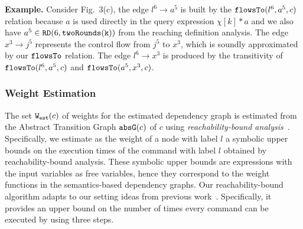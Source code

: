 \textbf{Example.}
Consider Fig.~3(c),  
the edge $l^6 \to a^5$ is built by the $\mathtt{flowsTo}(l^6, a^5, c)$ relation because
$a$ is used directly in the query expression $\chi[k]*a$
and we also have $a^5 \in \mathtt{RD}(6, \mathtt{twoRounds(k)})$ from the reaching definition analysis.
The edge $x^3 \to j^5$  represents the control flow from $j^5$ to $x^3$, which is soundly approximated by our $\mathtt{flowsTo}$ relation.
The edge $l^6 \to x^3$ is produced by the transitivity of $\mathtt{flowsTo}(l^6, a^5, c)$ and $\mathtt{flowsTo}(a^5, x^3, c)$. 

\subsubsection{Weight Estimation}
\label{sec:alg_weightgen}
The set $\mathtt{{W_{est}}}(c)$ of weights for the estimated dependency graph is estimated from the Abstract Transition Graph $\mathtt{abs}{\mathtt{G}}(c)$ of $c$ using \emph{reachability-bound analysis}~\cite{GulwaniZ10}. Specifically, we estimate as the weight of a node with label $l$ a symbolic upper bounds on the execution times of the command with label $l$ obtained by reachability-bound analysis. These symbolic upper bounds are expressions with the input variables as free variables, hence they correspond to the weight functions in the semantics-based dependency graphs. 
Our reachability-bound algorithm adapts to our setting ideas from previous work~\cite{ZulegerGSV11,SinnZV14,sinn2017complexity}.
Specifically, it provides an upper bound on the number of times every command can be executed by using three steps.
